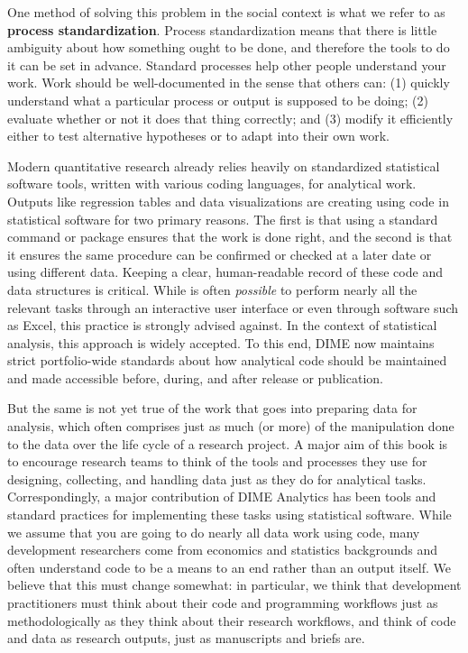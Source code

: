 One method of solving this problem in the social context
is what we refer to as \textbf{process standardization}.
Process standardization means that there is
little ambiguity about how something ought to be done,
and therefore the tools to do it can be set in advance.
Standard processes help other people understand your work.
Work should be well-documented in the sense that others can:
(1) quickly understand what a particular process or output is supposed to be doing;
(2) evaluate whether or not it does that thing correctly; and
(3) modify it efficiently either to test alternative hypotheses
or to adapt into their own work.

Modern quantitative research already relies heavily
on standardized statistical software tools,
written with various coding languages, for analytical work.
Outputs like regression tables and data visualizations
are creating using code in statistical software for two primary reasons.
The first is that using a standard command or package ensures that the work is done right,
and the second is that it ensures the same procedure can be confirmed or checked
at a later date or using different data.
Keeping a clear, human-readable record of these code and data structures is critical.
While is often \textit{possible} to perform nearly all the relevant tasks
through an interactive user interface or even through software such as Excel,
this practice is strongly advised against.
In the context of statistical analysis, this approach is widely accepted.
To this end, DIME now maintains strict portfolio-wide standards
about how analytical code should be maintained and made accessible
before, during, and after release or publication.

But the same is not yet true of the work that goes into preparing data for analysis,
which often comprises just as much (or more) of the manipulation done to the data
over the life cycle of a research project.
A major aim of this book is to encourage research teams
to think of the tools and processes they use
for designing, collecting, and handling data
just as they do for analytical tasks.
Correspondingly, a major contribution of DIME Analytics
has been tools and standard practices
for implementing these tasks using statistical software.
While we assume that you are going to do nearly all data work using code,
many development researchers come from economics and statistics backgrounds
and often understand code to be a means to an end rather than an output itself.
We believe that this must change somewhat:
in particular, we think that development practitioners
must think about their code and programming workflows
just as methodologically as they think about their research workflows,
and think of code and data as research outputs, just as manuscripts and briefs are.

